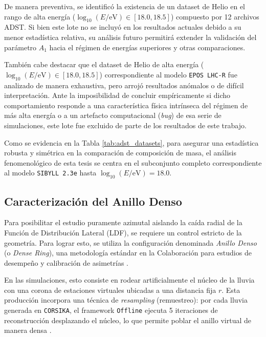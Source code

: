 De manera preventiva, se identificó la existencia de un dataset de Helio en el rango de alta energía ($\log_{10}(E/\mathrm{eV}) \in [18.0, 18.5]$) compuesto por 12 archivos ADST. Si bien este lote no se incluyó en los resultados actuales debido a su menor estadística relativa, su análisis futuro permitirá extender la validación del parámetro $A_1$ hacia el régimen de energías superiores y otras comparaciones.

También cabe destacar que el dataset de Helio de alta energía ($\log_{10}(E/\mathrm{eV}) \in [18.0, 18.5]$) correspondiente al modelo \texttt{EPOS LHC-R} fue analizado de manera exhaustiva, pero arrojó resultados anómalos o de difícil interpretación. Ante la imposibilidad de concluir empíricamente si dicho comportamiento responde a una característica física intrínseca del régimen de más alta energía o a un artefacto computacional (\textit{bug}) de esa serie de simulaciones, este lote fue excluido de parte de los resultados de este trabajo.

Como se evidencia en la Tabla \ref{tab:adst_datasets}, para asegurar una estadística robusta y simétrica en la comparación de composición de masa, el análisis fenomenológico de esta tesis se centra en el subconjunto completo correspondiente al modelo \texttt{SIBYLL 2.3e} hasta $\log_{10}(E/\mathrm{eV}) = 18.0$.

\subsection{Caracterización del Anillo Denso}
\label{subsec:anillo_denso}

Para posibilitar el estudio puramente azimutal aislando la caída radial de la Función de Distribución Lateral (LDF), se requiere un control estricto de la geometría. Para lograr esto, se utiliza la configuración denominada \textit{Anillo Denso} (o \textit{Dense Ring}), una metodología estándar en la Colaboración para estudios de desempeño y calibración de asimetrías \cite{BradfieldThesis}.

En las simulaciones, esto consiste en rodear artificialmente el núcleo de la lluvia con una corona de estaciones virtuales ubicadas a una distancia fija $r$. Esta producción incorpora una técnica de \textit{resampling} (remuestreo): por cada lluvia generada en \texttt{CORSIKA}, el framework \texttt{Offline} ejecuta 5 iteraciones de reconstrucción desplazando el núcleo, lo que permite poblar el anillo virtual de manera densa \cite{BradfieldThesis}.

